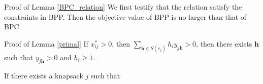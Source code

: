 \begin{pf}{Proof of Lemma \ref{BPC_relation}}
We first testify that the relation satisfy the constraints in BPP. Then the objective value of BPP is no larger than that of BPC.


\end{pf}

\begin{pf}{Proof of Lemma \ref{primal}}
  If $x_{ij}^{*}>0$, then $\sum_{\bm{h} \in S(c_{j})} h_i y_{j \bm{h}} >0$, then there exists $\bm{h}$ such that $y_{j \bm{h}} >0$ and $h_{i} \geq 1$.

  If there exists a knapsack $j$ such that
\end{pf}

\newpage